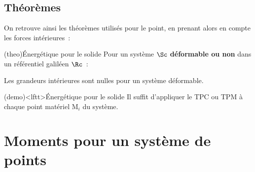 \documentclass[../../main/main.tex]{subfiles}
\begin{document}
\subsection{Théorèmes}
On retrouve ainsi les théorèmes utilisés pour le point, en prenant alors en
compte les forces intérieures~:
\begin{tcb*}(theo){Énergétique pour le solide}
  Pour un système $\Sc$ \textbf{déformable ou non} dans un référentiel galiléen
  $\Rc$~:
  \smallbreak
	\begin{isd}
		\begin{center}
		\end{center}
    \vspace{-15pt}
		\tcblower
		\begin{center}
		\end{center}
    \vspace{-15pt}
	\end{isd}
  Les grandeurs intérieures sont nulles pour un système déformable.
\end{tcb*}

\begin{tcb*}(demo)<lftt>{Énergétique pour le solide}
	Il suffit d'appliquer le TPC ou TPM à chaque point matériel M$_i$ du
	système.
\end{tcb*}

\section{Moments pour un système de points}
\end{document}
